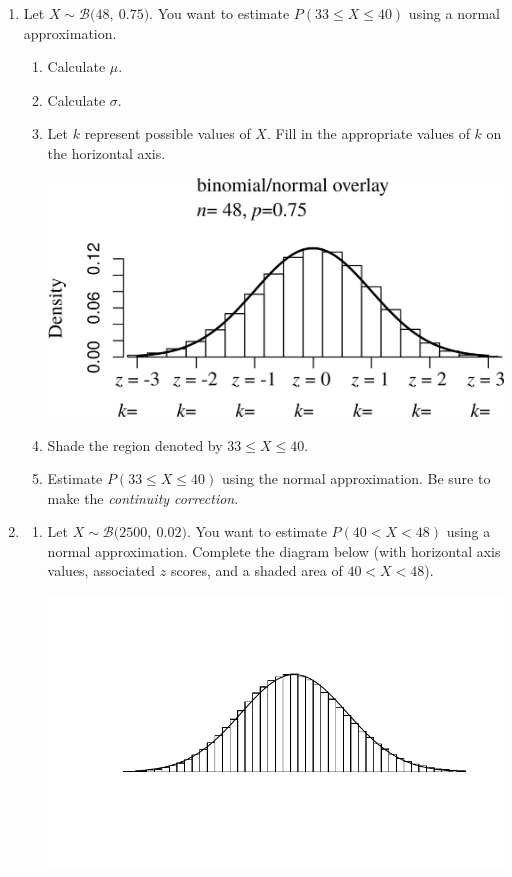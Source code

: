 \documentclass[12pt,letterpaper]{article}
\newcommand{\B}[2]{\mathcal{B}\big(#1,~#2\big)}
\begin{document}
 \large
\begin{enumerate}
\item Let $X\sim \B{48}{0.75}$. You want to estimate $P(33 \le X \le 40)$ using a normal approximation.
\begin{enumerate}
\item Calculate $\mu$.
\vfill
\item Calculate $\sigma$.
\vfill
\item Let $k$ represent possible values of $X$. Fill in the appropriate values of $k$ on the horizontal axis.

\vspace{20pt}
\includegraphics[scale=1.3]{nice_binos/prob1}
\vspace{5pt}
\item Shade the region denoted by $33 \le X \le 40$.
\vfill
\item Estimate $P(33 \le X \le 40)$ using the normal approximation. Be sure to make the \emph{continuity correction}.
\vfill
\end{enumerate}

\newpage

\item \begin{enumerate}
\item Let $X\sim \B{2500}{0.02}$. You want to estimate $P(40 < X < 48)$ using a normal approximation. Complete the diagram below (with horizontal axis values, associated $z$ scores, and a shaded area of $40 < X < 48$).

\hspace{-100pt}
\includegraphics[scale=1.5]{nice_binos/overlay_2500_0p02.pdf}


\end{enumerate}
\end{enumerate}
\end{document}
